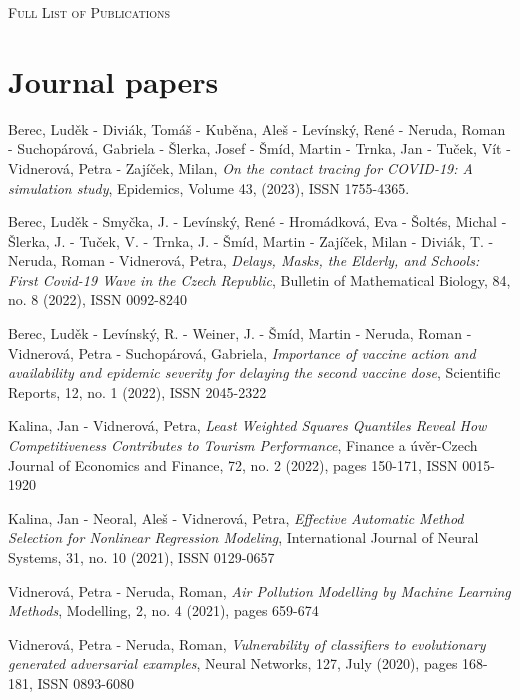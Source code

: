 \pagebreak

\noindent
{\fontsize{18}{18}\selectfont\scshape Full List of Publications} 

\section{Journal papers}
Berec, Luděk -  Diviák,  Tomáš - Kuběna, Aleš - Levínský, René - Neruda, Roman - Suchopárová, Gabriela - Šlerka,  Josef - Šmíd, Martin - Trnka, Jan - Tuček, Vít - Vidnerová, Petra - Zajíček, Milan,
{\em On the contact tracing for COVID-19: A simulation study}, 
Epidemics, Volume 43, (2023), ISSN 1755-4365.

\vspace{0.4em}
\noindent
Berec, Luděk - Smyčka, J. - Levínský, René - Hromádková, Eva - Šoltés, Michal - Šlerka, J. - Tuček, V. - Trnka, J. - Šmíd, Martin - Zajíček, Milan - Diviák, T. - Neruda, Roman - Vidnerová, Petra, {\em Delays, Masks, the Elderly, and Schools: First Covid-19 Wave in the Czech Republic}, Bulletin of Mathematical Biology,  84, no. 8 (2022), ISSN 0092-8240

\vspace{0.4em}
\noindent
Berec, Luděk - Levínský, R. - Weiner, J. - Šmíd, Martin - Neruda, Roman - Vidnerová, Petra - Suchopárová, Gabriela, {\em Importance of vaccine action and availability and epidemic severity for delaying the second vaccine dose}, Scientific Reports,  12, no. 1 (2022), ISSN 2045-2322

\vspace{0.4em}
\noindent
Kalina, Jan - Vidnerová, Petra, {\em Least Weighted Squares Quantiles Reveal How Competitiveness Contributes to Tourism Performance}, Finance a úvěr-Czech Journal of Economics and Finance,  72, no. 2 (2022), pages 150-171, ISSN 0015-1920

\vspace{0.4em}
\noindent
Kalina, Jan - Neoral, Aleš - Vidnerová, Petra, {\em Effective Automatic Method Selection for Nonlinear Regression Modeling}, International Journal of Neural Systems,  31, no. 10 (2021), ISSN 0129-0657

\vspace{0.4em}
\noindent
Vidnerová, Petra - Neruda, Roman, {\em Air Pollution Modelling by Machine Learning Methods}, Modelling,  2, no. 4 (2021), pages 659-674

\vspace{0.4em}
\noindent
Vidnerová, Petra - Neruda, Roman, {\em Vulnerability of classifiers to evolutionary generated adversarial examples}, Neural Networks,  127, July (2020), pages 168-181, ISSN 0893-6080

